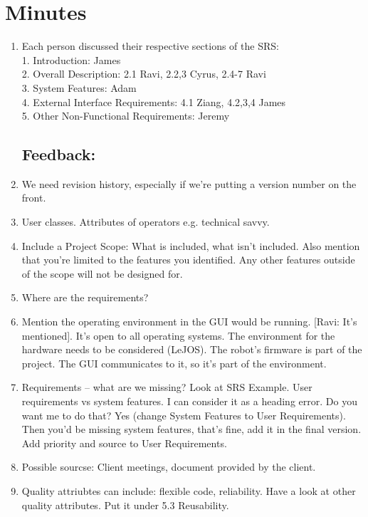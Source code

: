 \documentclass{article}
\begin{document}
\section{Minutes}
\begin{enumerate}
\subsection{SRS Presentation}
\item Each person discussed their respective sections of the SRS:\\
1. Introduction: James\\
2. Overall Description: 2.1 Ravi, 2.2,3 Cyrus, 2.4-7 Ravi\\
3. System Features: Adam\\
4. External Interface Requirements: 
4.1 Ziang, 4.2,3,4 James\\
5. Other Non-Functional Requirements: Jeremy\\

\subsection{Feedback:}
\item We need revision history, especially if we're putting a version number on the front.
\item User classes. Attributes of operators e.g. technical savvy.
\item Include a Project Scope: What is included, what isn’t included. Also mention that you're limited to the features you identified. Any other features outside of the scope will not be designed for.
\item Where are the requirements?
\item Mention the operating environment in the GUI would be running. [Ravi: It’s mentioned]. It's open to all operating systems. The environment for the hardware needs to be considered (LeJOS). The robot’s firmware is part of the project. The GUI communicates to it, so it’s part of the environment.
\item Requirements – what are we missing? Look at SRS Example. User requirements vs system features. I can consider it as a heading error. Do you want me to do that? Yes (change System Features to User Requirements). Then you'd be missing system features, that’s fine, add it in the final version. Add priority and source to User Requirements.
\item Possible sourcse: Client meetings, document provided by the client.
\item Quality attriubtes can include: flexible code, reliability. Have a look at other quality attributes. Put it under 5.3
Reusability.


\end{enumerate}
\end{document}

